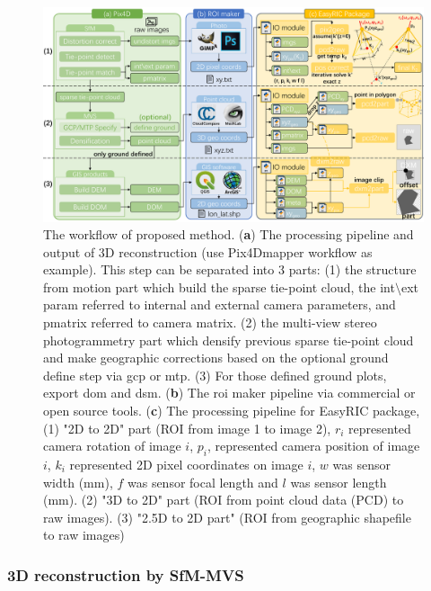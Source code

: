 \documentclass[sensors,article,submit,moreauthors, xelatex]{Definitions/mdpi}
\begin{document}
\begin{figure}[H]
  \centering
  \includegraphics[width=0.95\linewidth]{figures/workflow.pdf}
  \caption{The workflow of proposed method. (\textbf{a}) The processing pipeline and output of 3D reconstruction (use Pix4Dmapper workflow as example). This step can be separated into 3 parts: (1) the structure from motion part which build the sparse tie-point cloud, the int$\setminus$ext param referred to internal and external camera parameters, and pmatrix referred to camera matrix. (2) the multi-view stereo photogrammetry part which densify previous sparse tie-point cloud and make geographic corrections based on the optional ground define step via \acrfull*{gcp} or \acrfull*{mtp}. (3) For those defined ground plots, export \acrfull*{dom} and \acrfull*{dsm}. (\textbf{b}) The \acrfull*{roi} maker pipeline via commercial or open source tools. (\textbf{c}) The processing pipeline for EasyRIC package, (1) "2D to 2D" part (ROI from image 1 to image 2), $r_i$ represented camera rotation of image $i$, $p_i$, represented camera position of image $i$, $k_i$ represented 2D pixel coordinates on image $i$, $w$ was sensor width (mm), $f$ was sensor focal length and $l$ was sensor length (mm). (2) "3D to 2D" part (ROI from point cloud data (PCD) to raw images). (3) "2.5D to 2D part" (ROI from geographic shapefile to raw images)}
  \label{fig:workflow}
\end{figure}

\subsubsection{3D reconstruction by SfM-MVS}

\end{document}
